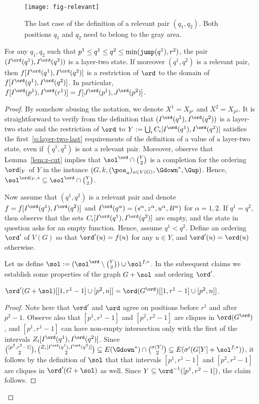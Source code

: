 \begin{figure}
\centering
\texttt{[image: fig-relevant]}
\caption{The last case of the definition of a relevant pair $(q_1,q_2)$.
  Both positions $q_1$ and $q_2$ need to belong to the gray area.}
\label{fig:relevant}
\end{figure}

\begin{lemma}\label{lem:layer-two-ord}
For any $q_1,q_2$ such that $p^1 \leq q^1 \leq q^2 \leq \min(\mathtt{jump}(q^1),r^2)$, the pair $(I^\ord(q^1),I^\ord(q^2))$ is a layer-two state.
If moreover $(q^1,q^2)$ is a relevant pair, then $f[I^\ord(q^1),I^\ord(q^2)]$ is a restriction of $\ord$ to the domain of $f[I^\ord(q^1),I^\ord(q^2)]$.
In particular, $f[I^\ord(p^1),I^\ord(r^1)] = f[J^\ord(p^1),J^\ord(p^2)]$.
\end{lemma}
\begin{proof}
By somehow abusing the notation, we denote $X^1=X_{p^1}$ and $X^2=X_{p^2}$. It is straightforward to verify from the definition that $(I^\ord(q^1),I^\ord(q^2))$ is a layer-two state
and the restriction of $\ord$ to $Y := \bigcup_i C_i[I^\ord(q^1),I^\ord(q^2)]$ satisfies the first~\ref{p:layer-two-last} requirements
of the definition of a value of a layer-two state, even if $(q^1,q^2)$ is not a relevant pair.
Moreover, observe that Lemma~\ref{lem:z-cut} implies that $\sol^\ord \cap \binom{Y}{2}$ is a completion for the ordering
$\ord|_Y$ of $Y$ in the instance $(G,k,(\pos_u)_{u \in V(G)},\Gdown^\ast,\Gup)$. Hence, $\sol^{\ord|_Y,\ast} \subseteq \sol^\ord \cap \binom{Y}{2}$.

Now assume that $(q^1,q^2)$ is a relevant pair and denote $f = f[I^\ord(q^1),I^\ord(q^2)]$ and $I^\ord(q^\alpha) = (s^\alpha,z^\alpha,u^\alpha,B^\alpha)$
for $\alpha=1,2$.
If $q^1 = q^2$, then observe that the sets $C_i[I^\ord(q^1),I^\ord(q^2)]$ are empty, and the state in question asks for an empty function. Hence, assume $q^1 < q^2$.
Define an ordering $\ord'$ of $V(G)$ so that $\ord'(u) = f(u)$ for any $u\in Y$, and $\ord'(u) = \ord(u)$ otherwise.

Let us define $\sol := (\sol^\ord \setminus \binom{Y}{2}) \cup \sol^{f,\ast}$. 
In the subsequent claims we establish some properties of the graph $G+\sol$ and ordering $\ord'$.
\begin{claim}\label{cl:layer-two:margins}
$\ord'(G+\sol)[[1,r^1-1]\cup[p^2,n]] = \ord(G^\ord)[[1,r^1-1]\cup[p^2,n]]$.
\end{claim}
\begin{proof}
Note here that $\ord'$ and $\ord$ agree on positions before $r^1$ and after $p^2-1$. Observe also that $[p^1,r^1-1]$ and $[p^2,r^2-1]$ are cliques in $\ord(G^\ord)$, and $[p^1,r^1-1]$ can have non-empty intersection only with the first of the intervals $Z_i[I^\ord(q^1),I^\ord(q^2)]$.
Since $\binom{[p^2,r^2-1]}{2},\binom{Z_i[I^\ord(q^1),I^\ord(q^2)]}{2}\subseteq E(\Gdown^\ast)\cap \binom{\sigma(Y)}{2}\subseteq E(\sigma'(G[Y]+\sol^{f,\ast}))$, it follows by the definition of $\sol$ that that intervals $[p^1,r^1-1]$ and $[p^2,r^2-1]$ are cliques in $\ord'(G+\sol)$ as well. Since $Y\subseteq \ord^{-1}([p^1,r^2-1])$, the claim follows.
\cqed\end{proof}


\end{proof}
